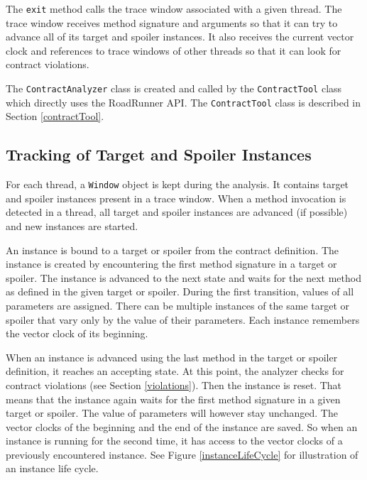 The \texttt{exit} method calls the trace window associated with a given thread.
The trace window receives method signature and arguments so that it can try to
advance all of its target and spoiler instances. It also receives the current
vector clock and references to trace windows of other threads so that it can
look for contract violations.

The \texttt{ContractAnalyzer} class is created and called by the
\texttt{ContractTool} class which directly uses the RoadRunner API. The
\texttt{ContractTool} class is described in Section \ref{contractTool}.


\subsection{Tracking of Target and Spoiler Instances}

For each thread, a \texttt{Window} object is kept during the analysis. It
contains target and spoiler instances present in a trace window. When a method
invocation is detected in a thread, all target and spoiler instances are
advanced (if possible) and new instances are started.

An instance is bound to a target or spoiler from the contract definition. The
instance is created by encountering the first method signature in a target or
spoiler. The instance is advanced to the next state and waits for the next
method as defined in the given target or spoiler. During the first transition,
values of all parameters are assigned. There can be multiple instances of the
same target or spoiler that vary only by the value of their parameters. Each
instance remembers the vector clock of its beginning.

When an instance is advanced using the last method in the target or spoiler
definition, it reaches an accepting state. At this point, the analyzer checks
for contract violations (see Section \ref{violations}). Then the instance is
reset. That means that the instance again waits for the first method signature
in a given target or spoiler. The value of parameters will however stay
unchanged. The vector clocks of the beginning and the end of the instance are
saved. So when an instance is running for the second time, it has access to the
vector clocks of a previously encountered instance. See Figure
\ref{instanceLifeCycle} for illustration of an instance life cycle.

